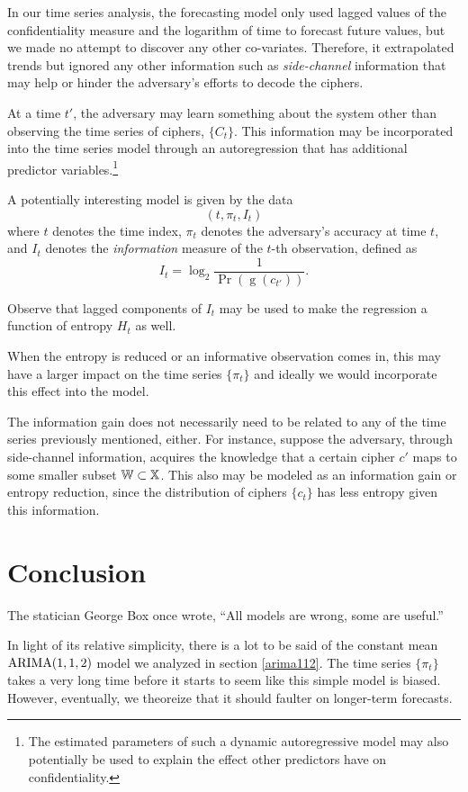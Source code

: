 \documentclass[final,
  11pt,
]{article}
\begin{document}
\label{sec:future} In our time series analysis, the forecasting model
only used lagged values of the confidentiality measure and the
logarithm of time to forecast future values, but we made no attempt
to discover any other co-variates.
Therefore, it extrapolated trends but ignored any other information such
as \emph{side-channel} information that may help or hinder the
adversary's efforts to decode the ciphers.

At a time \(t'\), the adversary may learn something about the system
other than observing the time series of ciphers, \(\{C_t\}\). This
information may be incorporated into the time series model through an
autoregression that has additional predictor variables.\footnote{
The estimated parameters of such a dynamic autoregressive model may
also potentially be used to explain the effect other predictors have on
confidentiality.}

A potentially interesting model is given by the data \[
  (t, \pi_t, I_t)
\] where \(t\) denotes the time index, \(\pi_t\) denotes the adversary's
accuracy at time \(t\), and \(I_t\) denotes the \emph{information}
measure of the \(t\)-th observation, defined as
\[
  I_t = \log_2 \frac{1}{\Pr(\operatorname{g}(c_{t'}))}.
\]

Observe that lagged components of \(I_t\) may be used to make the
regression a function of entropy \(H_t\) as well.

When the entropy is reduced or an informative observation comes in, this
may have a larger impact on the time series \(\{\pi_t\}\) and ideally we
would incorporate this effect into the model.

The information gain does not necessarily need to be related to any of
the time series previously mentioned, either. For instance, suppose the
adversary, through side-channel information, acquires the knowledge that
a certain cipher \(c'\) maps to some smaller subset
\(\mathbb{W} \subset \mathbb{X}\). This also may be modeled as an information
gain or entropy reduction, since the distribution of ciphers \(\{c_t\}\)
has less entropy given this information.

\hypertarget{conclusion}{%
\section{Conclusion}\label{conclusion}}
The statician George Box once wrote, ``All models are wrong, some are useful.''

In light of its relative simplicity, there is a lot to be said of the
constant mean $\operatorname{ARIMA}(1,1,2)$ model we analyzed in section \ref{arima112}.
The time series $\{\pi_t\}$ takes a very long time before it starts to
seem like this simple model is biased.
However, eventually, we theoreize that it should faulter on longer-term
forecasts.
\end{document}
